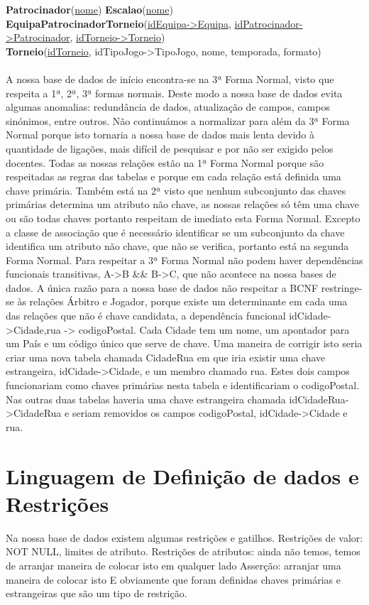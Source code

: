 \documentclass[a4paper]{article}
\begin{document}
\textbf{Patrocinador}(\underline{nome}) \textbf{Escalao}(\underline{nome}) \\
\textbf{EquipaPatrocinadorTorneio}(\underline{idEquipa->Equipa}, \underline{idPatrocinador->Patrocinador}, \underline{idTorneio->Torneio}) \\
\textbf{Torneio}(\underline{idTorneio}, idTipoJogo->TipoJogo, nome, temporada, formato) \\
\\\newline
A nossa base de dados de início encontra-se na 3ª Forma Normal, visto que respeita a 1ª, 2ª, 3ª formas normais. Deste modo a nossa base de dados evita algumas anomalias: redundância de dados, atualização de campos, campos sinónimos, entre outros. Não continuámos a normalizar para além da 3ª Forma Normal porque isto tornaria a nossa base de dados mais lenta devido à quantidade de ligações, mais difícil de pesquisar e por não ser exigido pelos docentes. Todas as nossas relações estão na 1ª Forma Normal porque são respeitadas as regras das tabelas e porque em cada relação está definida uma chave primária. Também está na 2ª visto que nenhum subconjunto das chaves primárias determina um atributo não chave, as nossas relações só têm uma chave ou são todas chaves portanto respeitam de imediato esta Forma Normal. Excepto a classe de associação que é necessário identificar se um subconjunto da chave identifica um atributo não chave, que não se verifica, portanto está na segunda Forma Normal. Para respeitar a 3ª Forma Normal não podem haver dependências funcionais transitivas, A->B \&\& B->C, que não acontece na nossa bases de dados. A única razão para a nossa base de dados não respeitar a BCNF restringe-se às relações Árbitro e Jogador, porque existe um determinante em cada uma das relações que não é chave candidata, a dependência funcional idCidade->Cidade,rua -> codigoPostal. Cada Cidade tem um nome, um apontador para um País e um código único que serve de chave. Uma maneira de corrigir isto seria criar uma nova tabela chamada CidadeRua em que iria existir uma chave estrangeira, idCidade->Cidade, e um membro chamado rua. Estes dois campos funcionariam como chaves primárias nesta tabela e identificariam o codigoPostal. Nas outras duas tabelas haveria uma chave estrangeira chamada idCidadeRua->CidadeRua e seriam removidos os campos codigoPostal, idCidade->Cidade e rua.

\section{Linguagem de Definição de dados e Restrições}
Na nossa base de dados existem algumas restrições e gatilhos.
Restrições de valor: NOT NULL, limites de atributo.
Restrições de atributos: ainda não temos, temos de arranjar maneira de colocar isto em qualquer lado
Asserção: arranjar uma maneira de colocar isto
E obviamente que foram definidas chaves primárias e estrangeiras que são um tipo de restrição.
\end{document}
